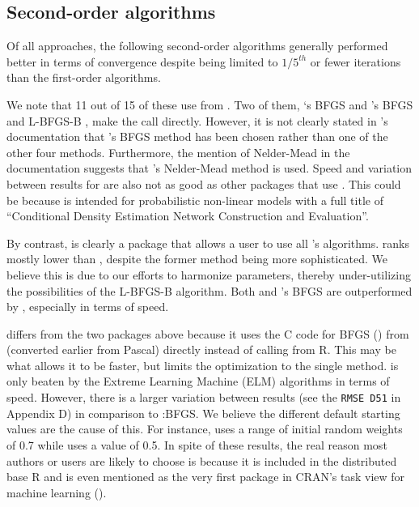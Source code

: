 \hypertarget{second-order-algorithms}{%
\subsection{Second-order algorithms}\label{second-order-algorithms}}

Of all approaches, the following second-order algorithms generally
performed better in terms of convergence despite being limited to
\(1/5^{th}\) or fewer iterations than the first-order algorithms.

We note that 11 out of 15 of these  use
 from . Two of them, `s BFGS
\citep{R-CaDENCE} and 's BFGS and L-BFGS-B
\citep{R-validann}, make the call directly. However, it is not clearly
stated in 's documentation that 's BFGS method
has been chosen rather than one of the other four methods. Furthermore,
the mention of Nelder-Mead in the documentation suggests that
's Nelder-Mead method is used. Speed and variation between
results for  are also not as good as other packages that
use . This could be because  is intended for
probabilistic non-linear models with a full title of ``Conditional
Density Estimation Network Construction and Evaluation''.

By contrast,  is clearly a package that allows a user to
use all 's algorithms.  ranks
mostly lower than , despite the former method
being more sophisticated. We believe this is due to our efforts to
harmonize parameters, thereby under-utilizing the possibilities of the
L-BFGS-B algorithm. Both  and 's BFGS are
outperformed by , especially in terms of speed.

 \citep{R-nnet} differs from the two packages above because it
uses the \textsf{C} code for BFGS () from 
(converted earlier from Pascal) directly instead of calling 
from R. This may be what allows it to be faster, but limits the
optimization to the single method.  is only beaten by the
Extreme Learning Machine (ELM) algorithms in terms of speed. However,
there is a larger variation between results (see the \texttt{RMSE\ D51}
in Appendix D) in comparison to :BFGS. We believe the
different default starting values are the cause of this. For instance,
 uses a range of initial random weights of 0.7 while
 uses a value of 0.5. In spite of these results, the real
reason most authors or users are likely to choose  is because
it is included in the distributed base \textsf{R} and is even mentioned
as the very first package in CRAN's task view for machine learning
().

